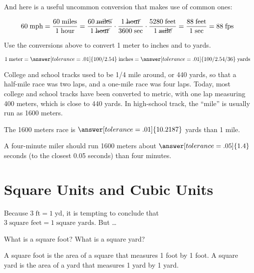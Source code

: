 \documentclass[nooutcomes]{ximera}
\begin{document}
And here is a useful uncommon conversion that makes use of common ones: 

\[
60\;\textrm{mph} = \frac{60\;\textrm{miles}}{1\;\textrm{hour}} 
=  \frac{60\;\cancel{\textrm{miles}}}{1\;\cancel{\textrm{hour}}} \cdot \frac{1\;\cancel{\textrm{hour}}}{3600\;\textrm{sec}} \cdot 
\frac{5280\;\textrm{feet}}{{1\;\cancel{\textrm{mile}}}} = \frac{88\;\textrm{feet}}{1\;\textrm{sec}} = 88\;\textrm{fps}
\]

\begin{question}
Use the conversions above to convert 1 meter to inches and to yards. 

\[
1\;\textrm{meter} = \answer[tolerance=.01]{100/2.54}\;\textrm{inches} = \answer[tolerance=.01]{100/2.54/36}\;\textrm{yards}
\] 

\end{question}

\begin{question}
College and school tracks used to be 1/4 mile around, or 440 yards, so that a half-mile race was two laps, and a one-mile race was four laps.  Today, most college and school tracks have been converted to metric, with one lap measuring 400 meters, which is close to 440 yards.  In high-school track, the ``mile'' is usually run as 1600 meters.  

The 1600 meters race is $\answer[tolerance=.01]{10.2187}$ yards  than 1 mile.  

A four-minute miler should run 1600 meters about $\answer[tolerance=.05]{1.4}$ seconds (to the closest 0.05 seconds)  than four minutes.  
\end{question}


\section{Square Units and Cubic Units}
Because $3\;\textrm{ft} = 1 \;\textrm{yd}$, it is tempting to conclude that $3\;\textrm{square feet} = 1 \;\textrm{square yards}$.  But \dots

\begin{question}
What is a square foot?  What is a square yard? 
\begin{freeResponse}
\begin{hint}
A square foot is the area of a square that measures 1 foot by 1 foot.  A square yard is the area of a yard that measures 1 yard by 1 yard. 
\end{hint}
\end{freeResponse}
\end{question}
\end{document}
